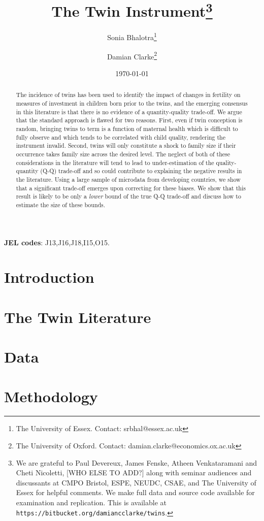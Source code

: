 \documentclass{article}[11pt,subeqn]
\title{The Twin Instrument\footnote{We are grateful to Paul Devereux, James Fenske, 
Atheen Venkataramani and Cheti Nicoletti,  [WHO ELSE TO ADD?] along with seminar 
audiences and discussants at CMPO Bristol, 
ESPE, NEUDC, CSAE, and The University of Essex for helpful comments.  We make full data and
source code available for examination and replication.  This is available at
\texttt{https://bitbucket.org/damiancclarke/twins}.}}
\author{Sonia Bhalotra\thanks{The University of Essex.  Contact: srbhal@essex.ac.uk} 
\and Damian Clarke\thanks{The University of Oxford.  Contact: damian.clarke@economics.ox.ac.uk}}
\date{\today}
\begin{document}
\begin{spacing}{1.4}

\maketitle
\begin{abstract}
 The incidence of twins has been used to identify the impact of changes in fertility 
 on measures of investment in children born prior to the twins, and the emerging 
 consensus in this literature is that there is no evidence of a quantity-quality 
 trade-off. We argue that the standard approach is flawed for two reasons. First, 
 even if twin conception is random, bringing twins to term is a function of maternal 
 health which is difficult to fully observe and which tends to be correlated with 
 child quality, rendering the instrument invalid. Second, twins will only constitute 
 a shock to family size if their occurrence takes family size across the desired 
 level. The neglect of both of these considerations in the literature will tend to 
 lead to under-estimation of the quality-quantity (Q-Q) trade-off and so could 
 contribute to explaining the negative results in the literature. Using a large sample
 of microdata from developing countries, we show that a significant trade-off emerges
 upon correcting for these biases.  We show that this result is likely to be only a 
 \emph{lower} bound of the true Q-Q trade-off and discuss how to estimate the size of
 these bounds. \\
\end{abstract}

\hspace{4mm}\textbf{\small JEL codes}: J13,J16,J18,I15,O15. \\
\newpage
\section{Introduction}


\section{The Twin Literature}


\section{Data}


\section{Methodology}
\label{TWINscn:method}



\end{spacing}
\end{document}
